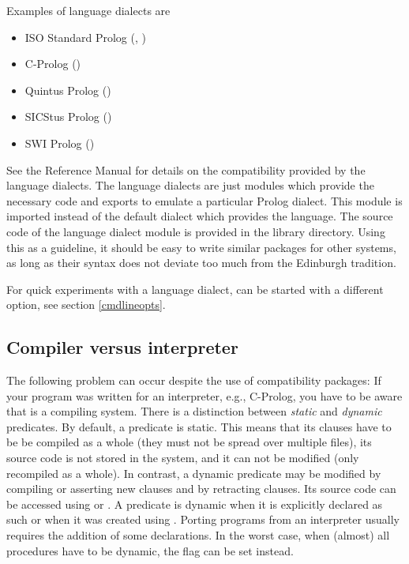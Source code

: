 Examples of language dialects are
\begin{itemize}
\item ISO Standard Prolog
    (,
    )
\item C-Prolog ()
\item Quintus Prolog ()
\item SICStus Prolog ()
\item SWI Prolog ()
\end{itemize}
See the Reference Manual for details on the compatibility provided by the
language dialects.
The language dialects are just modules which provide the necessary code
and exports  to emulate a particular Prolog dialect. This module is imported
instead of the default  dialect which provides the
{\eclipse} language.
The source code of the language dialect module is provided in the
{\eclipse} library directory.
Using this as a guideline, it should be easy to write similar packages for
other systems, as long as their syntax does not deviate too much
from the Edinburgh tradition.

For quick experiments with a language dialect, {\eclipse} can be started
with a different  option,
see section \ref{cmdlineopts}.


\subsection{Compiler versus interpreter}
The following problem can occur despite the use of compatibility packages:
If your program was written for an interpreter, e.g., C-Prolog,
you have to be aware that {\eclipse} is a compiling system.
There is a distinction between \emph{static} and \emph{dynamic} predicates.
By default, a predicate is static. This means that its clauses have to be
be compiled as a whole (they must not be spread over multiple files),
its source code is not stored in the system,
and it can not be modified (only recompiled as a whole).
In contrast, a dynamic predicate may be modified by compiling or
asserting new clauses and by retracting clauses.
Its source code can be accessed using
%
or
.%
A predicate is dynamic when it is explicitly declared as such or when
it was created using .
Porting programs from an interpreter usually requires the addition of
some  declarations.
In the worst case, when (almost) all procedures have to be dynamic,
the flag  can be set instead.



